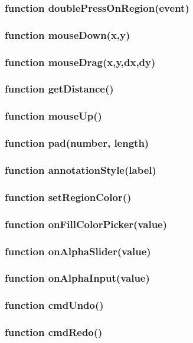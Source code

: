 \subsubsection{function doublePressOnRegion(event)}
\subsubsection{function mouseDown(x,y)}
\subsubsection{function mouseDrag(x,y,dx,dy)}
\subsubsection{function getDistance()}
\subsubsection{function mouseUp()}
\subsubsection{function pad(number, length)}
\subsubsection{function annotationStyle(label)}
\subsubsection{function setRegionColor()}
\subsubsection{function onFillColorPicker(value)}
\subsubsection{function onAlphaSlider(value)}
\subsubsection{function onAlphaInput(value)}
\subsubsection{function cmdUndo()}
\subsubsection{function cmdRedo()}
